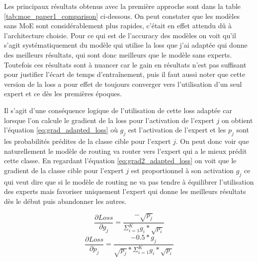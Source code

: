 \documentclass{article}
\begin{document}
Les principaux résultats obtenus avec la première approche sont dans la table \ref{tab:moe_paper1_comparison} ci-dessous. On peut constater que les modèles sans MoE sont considérablement plus rapides, c'était en effet attendu dû à l'architecture choisie. Pour ce qui est de l'accuracy des modèles on voit qu'il s'agit systématiquement du modèle qui utilise la loss que j'ai adaptée qui donne des meilleurs résultats, qui sont donc meilleurs que le modèle sans experts. Toutefois ces résultats sont à nuancer car le gain en résultats n'est pas suffisant pour justifier l'écart de temps d'entraînement, puis il faut aussi noter que cette version de la loss a pour effet de toujours converger vers l'utilisation d'un seul expert et ce dès les premières époques.

Il s'agit d'une conséquence logique de l'utilisation de cette loss adaptée car lorsque l'on calcule le gradient de la loss pour l'activation de l'expert $j$ on obtient l'équation \eqref{eq:grad_adapted_loss} où $g_j$ est l'activation de l'expert et les $p_j$ sont les probabilités prédites de la classe cible pour l'expert $j$. On peut donc voir que naturellement le modèle de routing va router vers l'expert qui a le mieux prédit cette classe. En regardant l'équation \eqref{eq:grad2_adapted_loss} on voit que le gradient de la classe cible pour l'expert $j$ est proportionnel à son activation $g_j$ ce qui veut dire que si le modèle de routing ne va pas tendre à équilibrer l'utilisation des experts mais favoriser uniquement l'expert qui donne les meilleurs résultats dès le début puis abandonner les autres.

\begin{equation}
 \frac{\partial Loss}{\partial g_j} = \frac{-\sqrt{p_j}}{\Sigma_{i=1}^{K}{g_i*\sqrt{p_i}}}
 \label{eq:grad_adapted_loss}
\end{equation}
\begin{equation}
 \frac{\partial Loss}{\partial p_j} = \frac{-0.5*g_j}{\sqrt{p_j}*\Sigma_{i=1}^{K}{g_i*\sqrt{p_i}}}
 \label{eq:grad2_adapted_loss}
\end{equation}
\end{document}
